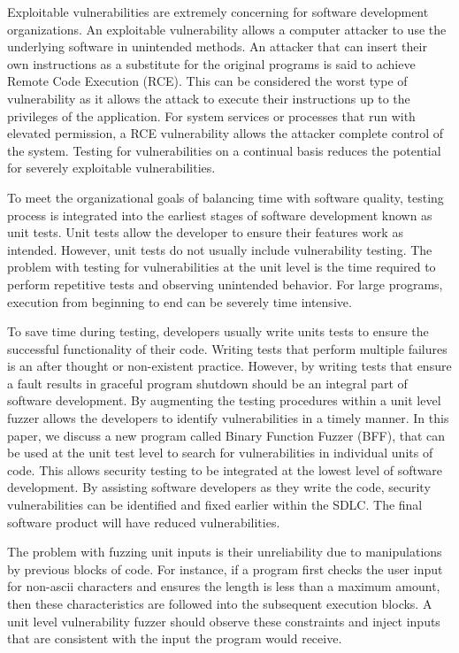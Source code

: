 \documentclass[conference]{IEEEtran}
\begin{document}
Exploitable vulnerabilities are extremely concerning for software development organizations. An exploitable vulnerability allows a computer attacker to use the underlying software in unintended methods. An attacker that can insert their own instructions as a substitute for the original programs is said to achieve Remote Code Execution (RCE). This can be considered the worst type of vulnerability as it allows the attack to execute their instructions up to the privileges of the application. For system services or processes that run with elevated permission, a RCE vulnerability allows the attacker complete control of the system. Testing for vulnerabilities on a continual basis reduces the potential for severely exploitable vulnerabilities.

To meet the organizational goals of balancing time with software quality, testing process is integrated into the earliest stages of software development known as unit tests. Unit tests allow the developer to ensure their features work as intended. However, unit tests do not usually include vulnerability testing. The problem with testing for vulnerabilities at the unit level is the time required to perform repetitive tests and observing unintended behavior. For large programs, execution from beginning to end can be severely time intensive. 

To save time during testing, developers usually write units tests to ensure the successful functionality of their code. Writing tests that perform multiple failures is an after thought or non-existent practice. However, by writing tests that ensure a fault results in graceful program shutdown should be an integral part of software development. By augmenting the testing procedures within a unit level fuzzer allows the developers to identify vulnerabilities in a timely manner. In this paper, we discuss a new program called Binary Function Fuzzer (BFF), that can be used at the unit test level to search for vulnerabilities in individual units of code. This allows security testing to be integrated at the lowest level of software development. By assisting software developers as they write the code, security vulnerabilities can be identified and fixed earlier within the SDLC. The final software product will have reduced vulnerabilities.

The problem with fuzzing unit inputs is their unreliability due to manipulations by previous blocks of code. For instance, if a program first checks the user input for non-ascii characters and ensures the length is less than a maximum amount, then these characteristics are followed into the subsequent execution blocks. A unit level vulnerability fuzzer should observe these constraints and inject inputs that are consistent with the input the program would receive. 
\end{document}
